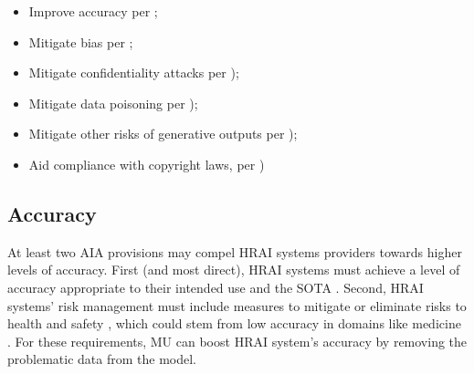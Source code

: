 \begin{itemize}[noitemsep, topsep=0pt]
    \item Improve accuracy per \citet[Arts. 9, 15]{european_union_ai_act_2024}; 
    \item Mitigate bias per \citet[Arts. 9, 55]{european_union_ai_act_2024}; 
    \item Mitigate confidentiality attacks per \citet[Arts. 9, 15, 55]{european_union_ai_act_2024}); 
    \item Mitigate data poisoning per \citet[Arts. 15]{european_union_ai_act_2024}); 
    \item Mitigate other risks of generative outputs per \citet[Arts. 9, 55]{european_union_ai_act_2024}); 
    \item Aid compliance with copyright laws, per \citet[Art. 53]{european_union_ai_act_2024})
\end{itemize}



 

 

\subsection{Accuracy}
\label{sssec:accuracy}

At least two AIA provisions may compel HRAI systems providers towards higher levels of accuracy. First (and most direct), HRAI systems must achieve a level of accuracy appropriate to their intended use and the SOTA \citep[Art. 15.1; Rec. 74]{european_union_ai_act_2024}. Second, HRAI systems' risk management must include measures to mitigate or eliminate risks to health and safety \citep[Art. 9]{european_union_ai_act_2024}, which could stem from low accuracy in domains like medicine \citep{jongsma2024why, james, Heaven2021}. For these requirements, MU can boost HRAI system's accuracy by removing the problematic data from the model. 

